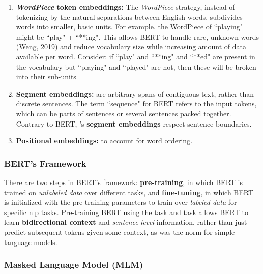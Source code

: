 \begin{enumerate}
    \item \textbf{\textit{WordPiece} token embeddings: }The \emph{WordPiece}  strategy, instead of tokenizing by the natural separations between English words, subdivides words into smaller, basic units. For example, the WordPiece  of ``playing" might be ``play" + ``**ing". This allows BERT to handle rare, unknown words (Weng, 2019) and reduce vocabulary size while increasing amount of data available per word. Consider: if ``play" and ``**ing" and ``**ed" are present in the vocabulary but ``playing" and ``played" are not, then these will be broken into their sub-units
    
    \item \textbf{Segment embeddings: }are  arbitrary spans of contiguous text, rather than discrete sentences. The term ``sequence" for BERT refers to the input tokens, which can be parts of sentences or several sentences packed together. Contrary to BERT,  's \textbf{segment embeddings} respect sentence boundaries. 
    
    \item \textbf{\hyperref[sec:PosEncodings]{Positional embeddings}: } to account for word ordering. 
\end{enumerate}


\subsubsection{BERT's Framework}
 
There are two steps in BERT's framework: \textbf{pre-training}, in which BERT is trained on \emph{unlabeled data} over different tasks, and \textbf{fine-tuning}, in which BERT is initialized with the pre-training parameters to train over \emph{labeled data} for specific \hyperref[app:Appendix_NLPTasks]{nlp tasks}. Pre-training BERT using the  task and  task allows BERT to learn \textbf{bidirectional context} and \emph{sentence-level} information, rather than just predict subsequent tokens given some context, as was the norm for simple \hyperref[sec:LanguageModels]{language models}.


\subsubsection{Masked Language Model (MLM)} \label{sec:maskedlanguagemodelMLM}

